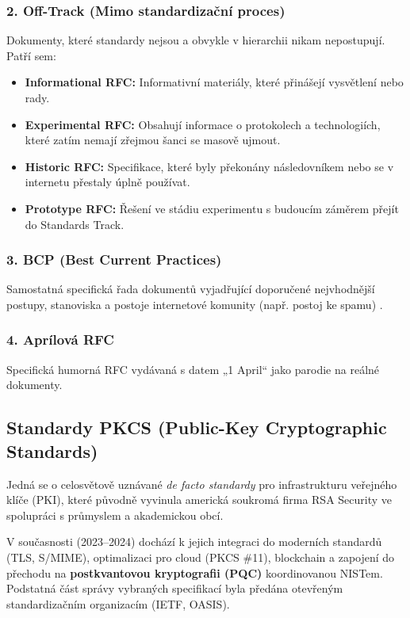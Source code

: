 \documentclass[10pt,a4paper]{article}
\begin{document}
	\subsubsection*{2. Off-Track (Mimo standardizační proces)}
	Dokumenty, které standardy nejsou a obvykle v hierarchii nikam nepostupují. Patří sem:
	\begin{itemize}
		\item \textbf{Informational RFC:} Informativní materiály, které přinášejí vysvětlení nebo rady.
		\item \textbf{Experimental RFC:} Obsahují informace o protokolech a technologiích, které zatím nemají zřejmou šanci se masově ujmout.
		\item \textbf{Historic RFC:} Specifikace, které byly překonány následovníkem nebo se v internetu přestaly úplně používat.
		\item \textbf{Prototype RFC:} Řešení ve stádiu experimentu s budoucím záměrem přejít do Standards Track.
	\end{itemize}
	
	\subsubsection*{3. BCP (Best Current Practices)}
	Samostatná specifická řada dokumentů vyjadřující doporučené nejvhodnější postupy, stanoviska a postoje internetové komunity (např. postoj ke spamu) .
	
	\subsubsection*{4. Aprílová RFC}
	Specifická humorná RFC vydávaná s datem „1 April“ jako parodie na reálné dokumenty. 
	
	\subsection{Standardy PKCS (Public-Key Cryptographic Standards)}
	Jedná se o celosvětově uznávané \textit{de facto standardy} pro infrastrukturu veřejného klíče (PKI), které původně vyvinula americká soukromá firma RSA Security ve spolupráci s průmyslem a akademickou obcí.
	
	V současnosti (2023–2024) dochází k jejich integraci do moderních standardů (TLS, S/MIME), optimalizaci pro cloud (PKCS \#11), blockchain a zapojení do přechodu na \textbf{postkvantovou kryptografii (PQC)} koordinovanou NISTem. 
	Podstatná část správy vybraných specifikací byla předána otevřeným standardizačním organizacím (IETF, OASIS).
	
\end{document}
